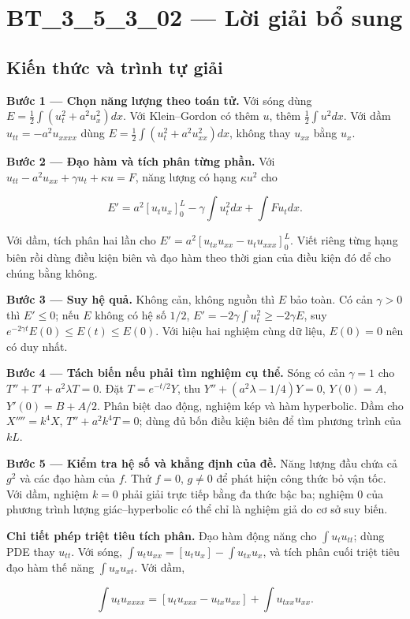 \documentclass[10pt,a4paper]{article}
\begin{document}
\section*{BT\_3\_5\_3\_02 — Lời giải bổ sung}
\subsection*{Kiến thức và trình tự giải}
\textbf{Bước 1 — Chọn năng lượng theo toán tử.} Với sóng dùng $E=\frac12\int(u_t^2+a^2u_x^2)dx$. Với Klein–Gordon có thêm $u$, thêm $\frac12\int u^2dx$. Với dầm $u_{tt}=-a^2u_{xxxx}$ dùng $E=\frac12\int(u_t^2+a^2u_{xx}^2)dx$, không thay $u_{xx}$ bằng $u_x$.

\textbf{Bước 2 — Đạo hàm và tích phân từng phần.} Với $u_{tt}-a^2u_{xx}+\gamma u_t+\kappa u=F$, năng lượng có hạng $\kappa u^2$ cho


\[
E'=a^2[u_tu_x]_0^L-\gamma\int u_t^2dx+\int Fu_tdx.
\]


Với dầm, tích phân hai lần cho $E'=a^2[u_{tx}u_{xx}-u_tu_{xxx}]_0^L$. Viết riêng từng hạng biên rồi dùng điều kiện biên và đạo hàm theo thời gian của điều kiện đó để cho chúng bằng không.

\textbf{Bước 3 — Suy hệ quả.} Không cản, không nguồn thì $E$ bảo toàn. Có cản $\gamma>0$ thì $E'\le0$; nếu $E$ không có hệ số $1/2$, $E'=-2\gamma\int u_t^2\ge-2\gamma E$, suy $e^{-2\gamma t}E(0)\le E(t)\le E(0)$. Với hiệu hai nghiệm cùng dữ liệu, $E(0)=0$ nên có duy nhất.

\textbf{Bước 4 — Tách biến nếu phải tìm nghiệm cụ thể.} Sóng có cản $\gamma=1$ cho $T''+T'+a^2\lambda T=0$. Đặt $T=e^{-t/2}Y$, thu $Y''+(a^2\lambda-1/4)Y=0$, $Y(0)=A$, $Y'(0)=B+A/2$. Phân biệt dao động, nghiệm kép và hàm hyperbolic. Dầm cho $X''''=k^4X$, $T''+a^2k^4T=0$; dùng đủ bốn điều kiện biên để tìm phương trình của $kL$.

\textbf{Bước 5 — Kiểm tra hệ số và khẳng định của đề.} Năng lượng đầu chứa cả $g^2$ và các đạo hàm của $f$. Thử $f=0$, $g\ne0$ để phát hiện công thức bỏ vận tốc. Với dầm, nghiệm $k=0$ phải giải trực tiếp bằng đa thức bậc ba; nghiệm $0$ của phương trình lượng giác–hyperbolic có thể chỉ là nghiệm giả do cơ sở suy biến.

\textbf{Chi tiết phép triệt tiêu tích phân.} Đạo hàm động năng cho $\int u_tu_{tt}$; dùng PDE thay $u_{tt}$. Với sóng, $\int u_tu_{xx}=[u_tu_x]-\int u_{tx}u_x$, và tích phân cuối triệt tiêu đạo hàm thế năng $\int u_xu_{xt}$. Với dầm,


\[
\int u_tu_{xxxx}=[u_tu_{xxx}-u_{tx}u_{xx}]+\int u_{txx}u_{xx}.
\]
\end{document}
